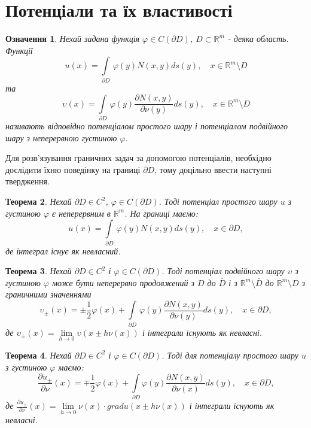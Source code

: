 \documentclass[a4 paper,12pt,ukrainian]{report}
\newtheorem{theorem}{\textbf{Теорема}}[chapter]
\newtheorem{determination}[theorem]{\textbf{Означення}}
\begin{document}
\section{Потенціали та їх властивості}
\begin{determination}
Нехай задана функція $\varphi\in C(\partial D)$, $D\subset\mathbb{R}^m$ - деяка область. Функції
\begin{equation*}
u(x) = \int\limits_{\partial{D}} \, \varphi(y)N(x,y) ds(y) , \quad x \in \mathbb{R}^m\setminus D
\end{equation*}
та
\begin{equation*}
\upsilon(x) = \int\limits_{\partial{D}} \, \varphi(y)\frac{\partial N(x,y)}{\partial\nu(y)} ds(y) , \quad x \in \mathbb{R}^m\setminus D
\end{equation*}
називають відповідно потенціалом простого шару і потенціалом подвійного шару з неперервною густиною $\varphi$.
\end{determination}
\hspace*{\parindent}Для розв'язування граничних задач за допомогою потенціалів, необхідно дослідити їхню поведінку на границі $\partial{D}$, тому доцільно ввести наступні твердження.
\begin{theorem}
Нехай $\partial{D}\in C^2$, $\varphi\in C(\partial{D})$. Тоді потенціал простого шару $u$ з густиною $\varphi$ є неперервним в $\mathbb{R}^m$. На границі маємо:
\begin{equation*}
u(x) = \int\limits_{\partial{D}} \, \varphi(y)N(x,y) ds(y) , \quad x \in \partial D,
\end{equation*}
де інтеграл існує як невласний.
\end{theorem}
\begin{theorem}
Нехай $\partial D\in C^2$ і $\varphi\in C(\partial D)$. Тоді потенціал подвійного шару $\upsilon$ з густиною $\varphi$ може бути неперервно продовжений з $D$ до $\bar{D}$ і з $\mathbb{R}^m\setminus\bar{D}$ до $\mathbb{R}^m\setminus D$ з граничними значеннями
\begin{equation*}
\upsilon_\pm(x) = \pm\frac{1}{2}\varphi(x)+\int\limits_{\partial{D}} \, \varphi(y)\frac{\partial N(x,y)}{\partial\nu(y)} ds(y) , \quad x \in \partial D,
\end{equation*}
де $\upsilon_\pm(x)=\lim\limits_{h \to 0}\upsilon(x\pm h\nu(x))$ і інтеграли існують як невласні. 
\end{theorem}
\begin{theorem}
Нехай $\partial D\in C^2$ і $\varphi\in C(\partial D)$. Тоді для потенціалу простого шару $u$ з густиною $\varphi$ маємо:
\begin{equation*}
\frac{\partial u_\pm}{\partial\nu}(x)=\mp\frac{1}{2}\varphi(x)+\int\limits_{\partial D}\varphi(y)\frac{\partial N(x,y)}{\partial\nu(x)} ds(y) , \quad x \in \partial D,
\end{equation*}
де $\frac{\partial u_\pm}{\partial\nu}(x)=\lim\limits_{h \to 0}\nu(x)\cdot gradu(x\pm h\nu(x))$ і інтеграли існують як невласні.
\end{theorem}
\end{document}
